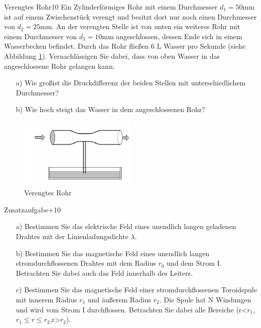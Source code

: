 \begin{exercise}{Verengtes Rohr}{10}
  Ein Zylinderförmiges Rohr mit einem Durchmesser $d_{1}=50$mm ist auf
  einem Zwischenstück verengt und besitzt dort nur noch einen Durchmesser von
  $d_{2}=25$mm. An der verengten Stelle ist von unten ein weiteres Rohr mit
  einem Durchmesser von $d_{3}=10$mm angeschlossen, dessen Ende sich in einem
  Wasserbecken befindet. Durch das Rohr flie\ss en 6 L Wasser pro Sekunde
  (siehe Abbildung \ref{fig:Verengtes_Rohr}). Vernachlässigen Sie dabei, dass von
  oben Wasser in das angeschlossene Rohr gelangen kann.

  \begin{enumerate}
    \item [a)] Wie gro\ss ist die Druckdifferenz der beiden Stellen mit unterschiedlichem
               Durchmesser?
    \item [b)] Wie hoch steigt das Wasser in dem angeschlossenen Rohr?
  \end{enumerate}
\end{exercise}

\FloatBarrier

  \begin{figure}[h]
    \centering
    \includegraphics[width = 0.5\textwidth]{Rohr.jpg}
    \caption{Verengtes Rohr}
    \label{fig:Verengtes_Rohr}
  \end{figure}



\FloatBarrier
\newpage

\begin{exercise}{Zusatzaufgabe}{+10}
  \begin{enumerate}
    \item [a)] Bestimmen Sie das elektrische Feld eines unendlich langen geladenen Drahtes
               mit der Linienladungsdichte $\lambda$.
    \item [b)] Bestimmen Sie das magnetische Feld eines unendlich langen
               stromdurchflossenen Drahtes
               mit dem Radius $r_{0}$ und dem Strom I. Betrachten Sie dabei auch das Feld
               innerhalb des Leiters.
    \item [c)] Bestimmen Sie das magnetische Feld einer stromdurchflossenen
               Toroidspule mit innerem
               Radius $r_{1}$ und äu\ss erem Radius $r_{2}$. Die Spule hat N
               Windungen und wird vom Strom I durchflossen.
               Betrachten Sie dabei
               alle Bereiche (r<$r_{1}$,$r_{1}\leq r \leq r_{2}$,r>$r_{2}$).
  \end{enumerate}
\end{exercise}
